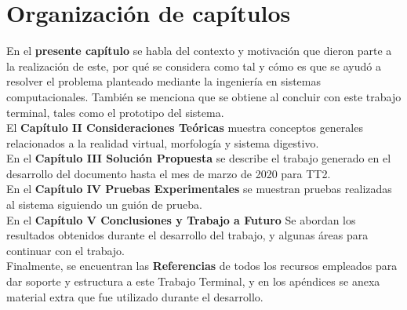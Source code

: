 \section{Organización de capítulos}
\vspace*{\fill}
En el \textbf{presente capítulo} se habla del contexto y motivación que dieron parte a la realización  de este, por qué se considera como tal y 
cómo es que se ayudó a resolver el problema planteado mediante la ingeniería en sistemas computacionales. También se menciona que se obtiene al 
concluir con este trabajo terminal, tales como el prototipo del sistema.\\
El \textbf{Capítulo II Consideraciones Teóricas} muestra conceptos generales relacionados a la realidad virtual, morfología y sistema digestivo.\\
En el \textbf{Capítulo III Soluci\'on Propuesta} se describe el trabajo generado en el desarrollo del documento hasta el mes de marzo de 2020 para TT2.\\
En el \textbf{Capítulo IV Pruebas Experimentales} se muestran pruebas realizadas al sistema siguiendo un guión de prueba.\\ 
En el \textbf{Capítulo V Conclusiones y Trabajo a Futuro} Se abordan los resultados obtenidos durante el desarrollo del trabajo, 
y algunas áreas para continuar con el trabajo.\\
Finalmente, se encuentran las \textbf{Referencias} de todos los recursos empleados para dar soporte y estructura a este Trabajo Terminal, y en los 
apéndices se anexa material extra que fue utilizado durante el desarrollo.\\
\vspace*{\fill}